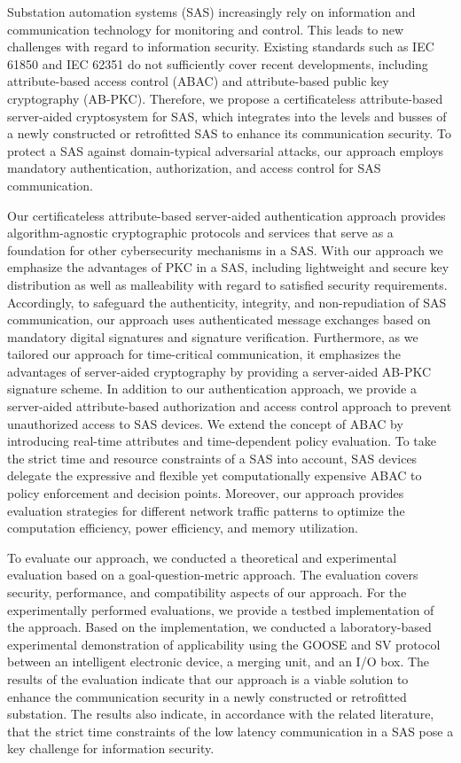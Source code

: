 \Abstract
Substation automation systems (SAS) increasingly rely on information and communication technology for monitoring and control.
This leads to new challenges with regard to information security.
Existing standards such as IEC 61850 and IEC 62351 do not sufficiently cover recent developments, including attribute-based access control (ABAC) and attribute-based public key cryptography (AB-PKC).
Therefore, we propose a certificateless attribute-based server-aided cryptosystem for SAS, which integrates into the levels and busses of a newly constructed or retrofitted SAS to enhance its communication security.
To protect a SAS against domain-typical adversarial attacks, our approach employs mandatory authentication, authorization, and access control for SAS communication.

Our certificateless attribute-based server-aided authentication approach provides algorithm-agnostic cryptographic protocols and services that serve as a foundation for other cybersecurity mechanisms in a SAS.
With our approach we emphasize the advantages of PKC in a SAS, including lightweight and secure key distribution as well as malleability with regard to satisfied security requirements.
Accordingly, to safeguard the authenticity, integrity, and non-repudiation of SAS communication, our approach uses authenticated message exchanges based on mandatory digital signatures and signature verification.
Furthermore, as we tailored our approach for time-critical communication, it emphasizes the advantages of server-aided cryptography by providing a server-aided AB-PKC signature scheme.
In addition to our authentication approach, we provide a server-aided attribute-based authorization and access control approach to prevent unauthorized access to SAS devices.
We extend the concept of ABAC by introducing real-time attributes and time-dependent policy evaluation.
To take the strict time and resource constraints of a SAS into account, SAS devices delegate the expressive and flexible yet computationally expensive ABAC to policy enforcement and decision points.
Moreover, our approach provides evaluation strategies for different network traffic patterns to optimize the computation efficiency, power efficiency, and memory utilization.

To evaluate our approach, we conducted a theoretical and experimental evaluation based on a goal-question-metric approach.
The evaluation covers security, performance, and compatibility aspects of our approach.
For the experimentally performed evaluations, we provide a testbed implementation of the approach.
Based on the implementation, we conducted a laboratory-based experimental demonstration of applicability using the GOOSE and SV protocol between an intelligent electronic device, a merging unit, and an I/O box.
The results of the evaluation indicate that our approach is a viable solution to enhance the communication security in a newly constructed or retrofitted substation.
The results also indicate, in accordance with the related literature, that the strict time constraints of the low latency communication in a SAS pose a key challenge for information security.
